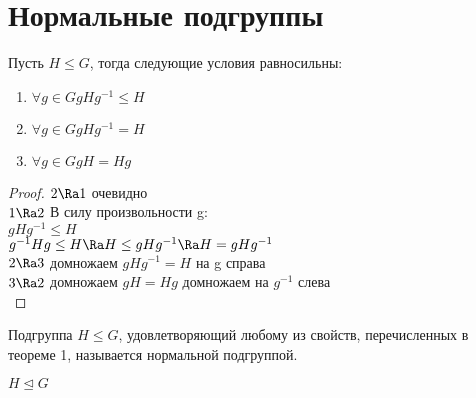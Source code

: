 \section{Нормальные подгруппы}
\begin{theorem}
 Пусть $H \le G$, тогда следующие условия равносильны:
 \begin{enumerate}
 \item $\forall g \in G gHg^{-1} \le H$\\
 \item $\forall g \in G gHg^{-1} = H$ \\
 \item $\forall g \in G gH = Hg$\\
 \end{enumerate}
\end{theorem}   
\begin{proof}
$2 \Ra 1$ очевидно\\
$1 \Ra 2$ В силу произвольности g:\\
$gHg^{-1} \le H$\\
$g^{-1}Hg \le H \Ra H \le gHg^{-1} \Ra H = gHg^{-1}$\\
$2 \Ra 3$ домножаем $gHg^{-1} = H$ на g справа\\
$3 \Ra 2$ домножаем $gH = Hg$ домножаем на $g^{-1}$ слева\\
\end{proof}

\begin{Def}
Подгруппа $H \le G$, удовлетворяющий любому из свойств, 
перечисленных в теореме 1, называется нормальной подгруппой.

$H \unlhd G$\\
\end{Def}

